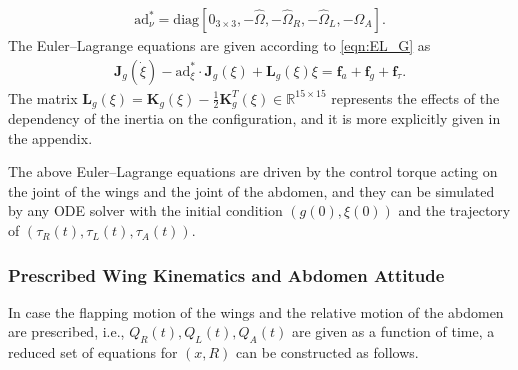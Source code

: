 \documentclass[10pt]{article}
\renewcommand{\Re}{\ensuremath{\mathbb{R}}}
\newcommand{\ad}{\ensuremath{\mathrm{ad}}}
\begin{document}
\begin{align}
    \mathrm{ad}^*_\nu = \mathrm{diag}[0_{3\times 3}, -\hat\Omega, -\hat\Omega_R, -\hat\Omega_L, - \hat\Omega_A].
\end{align}
The Euler--Lagrange equations are given according to \eqref{eqn:EL_G} as
\begin{gather}
    \mathbf{J}_g(\dot \xi) - \ad^*_\xi \cdot \mathbf{J}_g(\xi) + \mathbf{L}_g(\xi) \xi  = \mathbf{f}_a + \mathbf{f}_g + \mathbf{f}_\tau. \label{eqn:EL}
\end{gather}
The matrix  $\mathbf{L}_g(\xi) = \mathbf{K}_g(\xi)  - \frac{1}{2}\mathbf{K}^T_g(\xi)\in\Re^{15\times 15}$ represents the effects of the dependency of the inertia on the configuration, 
and it is more explicitly given in the appendix. 

The above Euler--Lagrange equations are driven by the control torque acting on the joint of the wings and the joint of the abdomen, 
and they can be simulated by any ODE solver with the initial condition $(g(0),\xi(0))$ and the trajectory of $(\tau_R(t),\tau_L(t),\tau_A(t))$. 

\subsubsection{Prescribed Wing Kinematics and Abdomen Attitude}

In case the flapping motion of the wings and the relative motion of the abdomen are prescribed, i.e., $Q_R(t), Q_L(t), Q_A(t)$ are given as a function of time, a reduced set of equations for $(x,R)$ can be constructed as follows. 
\end{document}
